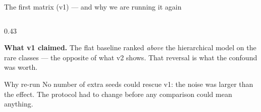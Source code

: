 \documentclass[aspectratio=169,11pt]{beamer}
\begin{document}
\begin{frame}{The first matrix (v1) --- and why we are running it again}
\begin{columns}[T]
\begin{column}{0.43\textwidth}
      \vspace{0.2em}
      {\scriptsize \textbf{What v1 claimed.} The flat baseline ranked
      \emph{above} the hierarchical model on the rare classes --- the opposite
      of what v2 shows. That reversal is what the confound was worth.\par}

      \vspace{0.3em}
      \begin{alertblock}{Why re-run}
        \scriptsize
        No number of extra seeds could rescue v1: the noise was larger than the
        effect. The protocol had to change before any comparison could mean
        anything.
      \end{alertblock}
    \end{column}
  \end{columns}
\end{frame}
\end{document}
